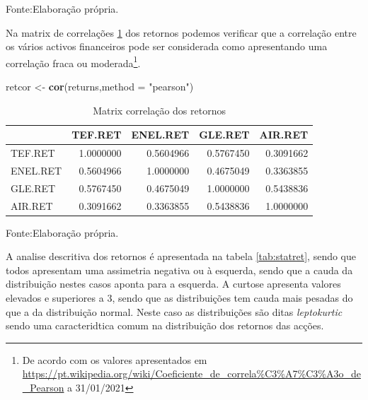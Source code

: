 \documentclass[
  12pt,
  a4paper,
  openany]{book}
\newenvironment{Shaded}{\begin{snugshade}}{\end{snugshade}}
\newcommand{\DataTypeTok}[1]{\textcolor[rgb]{0.13,0.29,0.53}{#1}}
\newcommand{\KeywordTok}[1]{\textcolor[rgb]{0.13,0.29,0.53}{\textbf{#1}}}
\newcommand{\NormalTok}[1]{#1}
\newcommand{\StringTok}[1]{\textcolor[rgb]{0.31,0.60,0.02}{#1}}
\begin{document}
Fonte:Elaboração própria.

\justifying
\bigskip

Na matrix de correlações \ref{tab:correl} dos retornos podemos verificar que a correlação entre os vários activos financeiros pode ser considerada como apresentando uma correlação fraca ou moderada\footnote{De acordo com os valores apresentados em \url{https://pt.wikipedia.org/wiki/Coeficiente_de_correla\%C3\%A7\%C3\%A3o_de_Pearson} a 31/01/2021}.

\scriptsize

\begin{Shaded}
\begin{Highlighting}[]
\NormalTok{retcor \textless{}{-}}\StringTok{ }\KeywordTok{cor}\NormalTok{(returns,}\DataTypeTok{method =} \StringTok{"pearson"}\NormalTok{)}
\end{Highlighting}
\end{Shaded}

\normalsize

\begin{table}[!h]

\caption{\label{tab:correl}Matrix correlação dos retornos}
\centering
\begin{tabular}[t]{lrrrr}
\toprule
  & TEF.RET & ENEL.RET & GLE.RET & AIR.RET\\
\midrule
TEF.RET & 1.0000000 & 0.5604966 & 0.5767450 & 0.3091662\\
ENEL.RET & 0.5604966 & 1.0000000 & 0.4675049 & 0.3363855\\
GLE.RET & 0.5767450 & 0.4675049 & 1.0000000 & 0.5438836\\
AIR.RET & 0.3091662 & 0.3363855 & 0.5438836 & 1.0000000\\
\bottomrule
\end{tabular}
\end{table}
\FloatBarrier
\centering

Fonte:Elaboração própria.

\justifying
\bigskip

A analise descritiva dos retornos é apresentada na tabela \ref{tab:statret}, sendo que todos apresentam uma assimetria negativa ou à esquerda, sendo que a cauda da distribuição nestes casos aponta para a esquerda. A curtose apresenta valores elevados e superiores a 3, sendo que as distribuições tem cauda mais pesadas do que a da distribuição normal. Neste caso as distribuições são ditas \emph{leptokurtic} sendo uma caracteridtica comum na distribuição dos retornos das acções.
\end{document}
